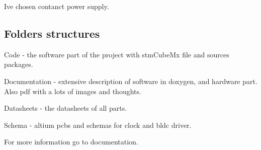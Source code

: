 I\textquotesingle{}ve chosen contanct power supply.

\subsection*{Folders structures}


\begin{DoxyEnumerate}
\item Code -\/ the software part of the project with stm\+Cube\+Mx file and sources packages.
\item Documentation -\/ extensive description of software in doxygen, and hardware part. Also pdf with a lots of images and thoughts.
\item Datasheets -\/ the datasheets of all parts.
\item Schema -\/ altium pcbs and schemas for clock and bldc driver.
\end{DoxyEnumerate}

For more information go to documentation. 